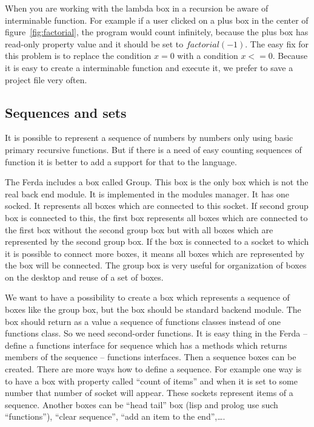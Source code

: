 \documentclass[a4paper,12pt]{book}
\begin{document}
When you are working with the lambda box in a recursion be aware of interminable function. For example if a user clicked on a plus box in the center of figure~\ref{fig:factorial}, the program would count infinitely, because the plus box has read-only property value and it should be set to $factorial(-1)$. The easy fix for this problem is to replace the condition $x=0$ with a condition $x<=0$. Because it is easy to create a interminable function and execute it, we prefer to save a project file very often.

\subsection{Sequences and sets}
\label{sec:sequences}
It is possible to represent a sequence of numbers by numbers only using basic primary recursive functions. But if there is a need of easy counting sequences of function it is better to add a support for that to the language.

The Ferda includes a box called Group. This box is the only box which is not the real back end module. It is implemented in the modules manager. It has one socked. It represents all boxes which are connected to this socket. If second group box is connected to this, the first box represents all boxes which are connected to the first box without the second group box but with all boxes which are represented by the second group box. If the box is connected to a socket to which it is possible to connect more boxes, it means all boxes which are represented by the box will be connected. The group box is very useful for organization of boxes on the desktop and reuse of a set of boxes.

We want to have a possibility to create a box which represents a sequence of boxes like the group box, but the box should be standard backend module. The box should return as a value a sequence of functions classes instead of one functions class. So we need second-order functions. It is easy thing in the Ferda -- define a functions interface for sequence which has a methods which returns members of the sequence -- functions interfaces. Then a sequence boxes can be created. There are more ways how to define a sequence. For example one way is to have a box with property called ``count of items'' and when it is set to some number that number of socket will appear. These sockets represent items of a sequence. Another boxes can be ``head tail'' box (lisp and prolog use such ``functions''), ``clear sequence'',  ``add an item to the end'',\dots.
\end{document}
